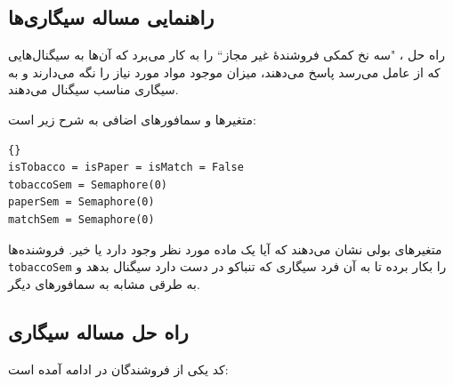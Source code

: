 \documentclass{book}
\newcommand{\clearemptydoublepage}{\newpage\cleardoublepage}
\begin{document}
\clearemptydoublepage
\subsection{راهنمایی مساله سیگاری‌ها}

    راه حل ، "سه نخ کمکی فروشندهٔ غیر مجاز`` را به کار می‌برد که آن‌ها به سیگنال‌هایی که از عامل‌
    می‌رسد پاسخ می‌دهند، میزان موجود مواد مورد نیاز را نگه می‌دارند و به سیگاری مناسب سیگنال می‌دهند. 

    متغیرها و سمافورهای اضافی به شرح زیر است: 

\begin{latin}
\begin{latin}
\begin{lstlisting}[title={راهنمایی مساله سیگاری‌ها}]{}
isTobacco = isPaper = isMatch = False
tobaccoSem = Semaphore(0)
paperSem = Semaphore(0)
matchSem = Semaphore(0)
\end{lstlisting}
\end{latin}
\end{latin}

    متغیرهای بولی نشان می‌دهند که آیا یک ماده مورد نظر وجود دارد یا خیر. 
    فروشنده‌‌ها {\tt tobaccoSem} را بکار برده تا به آن فرد سیگاری که تنباکو در دست دارد سیگنال بدهد و به طرقی مشابه به سمافورهای دیگر. 


\clearemptydoublepage
\subsection{راه حل مساله سیگاری}

    کد یکی از فروشندگان در ادامه آمده است:‌
\end{document}
